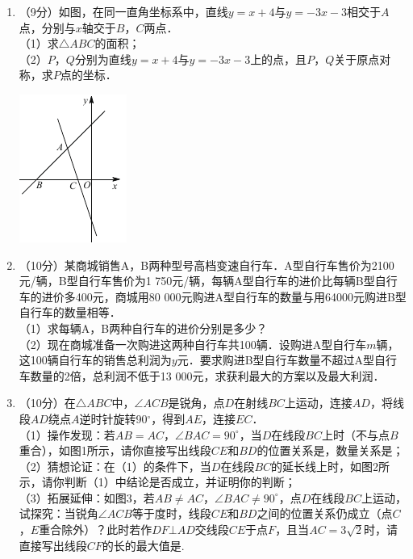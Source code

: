 \documentclass[11pt,twoside]{ctexart}
\begin{document}
\begin{enumerate}
\item
（9分）如图，在同一直角坐标系中，直线$y=x+4$与$y=-3x-3$相交于$A$点，分别与$x$轴交于$B$，$C$两点．
\\
（1）求$\triangle ABC$的面积；\\
（2）$P$，$Q$分别为直线$y=x+4$与$y=-3x-3$上的点，且$P$，$Q$关于原点对称，求$P$点的坐标．

\hfill\includegraphics[scale=1.5]{fig10.pdf}\quad


\item
（10分）某商城销售A，B两种型号高档变速自行车．A型自行车售价为2100元/辆，B型自行车售价为1 750元/辆，每辆A型自行车的进价比每辆B型自行车的进价多400元，商城用80 000元购进A型自行车的数量与用64000元购进B型自行车的数量相等．\\
（1）求每辆A，B两种自行车的进价分别是多少？\\
（2）现在商城准备一次购进这两种自行车共100辆．设购进A型自行车$m$辆，这100辆自行车的销售总利润为$y$元．要求购进B型自行车数量不超过A型自行车数量的2倍，总利润不低于13 000元，求获利最大的方案以及最大利润．

\vfill
\newpage

\item
（10分）在$\triangle ABC$中，$\angle ACB$是锐角，点$D$在射线$BC$上运动，连接$AD$，将线段$AD$绕点$A$逆时针旋转90$^{\circ }$，得到$AE$，连接$EC$．\\
（1）操作发现：若$AB=AC$，$\angle BAC=90^{\circ }$，当$D$在线段$BC$上时（不与点$B$重合），如图1所示，请你直接写出线段$CE$和$BD$的位置关系是\underline{\hspace*{2cm}}，数量关系是\underline{\hspace*{2cm}}；\\
（2）猜想论证：在（1）的条件下，当$D$在线段$BC$的延长线上时，如图2所示，请你判断（1）中结论是否成立，并证明你的判断；\\
（3）拓展延伸：如图3，若$AB\neq AC$，$\angle BAC\neq90^{\circ }$，点$D$在线段$BC$上运动，试探究：当锐角$\angle ACB$等于\underline{\hspace*{2cm}}度时，线段$CE$和$BD$之间的位置关系仍成立（点$C$，$E$重合除外）？此时若作$DF\bot AD$交线段$CE$于点$F$，且当$AC=3\sqrt2$时，请直接写出线段$CF$的长的最大值是\underline{\hspace*{2cm}}.


\end{enumerate}
\end{document}
